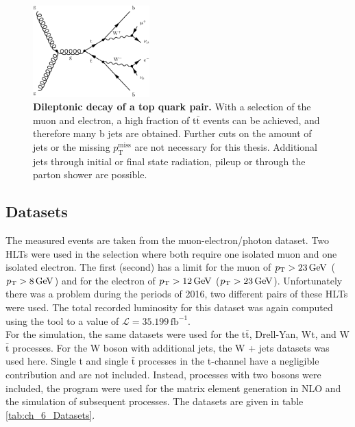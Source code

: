 \begin{figure}
\centering
\includegraphics[width=0.4\textwidth]{chapter_6_selection/Feynman/dilep_emu_tt.pdf}
\caption[Dileptonic Decay of a Top Quark Pair]{\textbf{Dileptonic decay of a top quark pair.} With a selection of the muon and electron, a high fraction of t$\bar{\textrm{t}}$ events can be achieved, and therefore many b jets are obtained. Further cuts on the amount of jets or the missing $p_\textrm{T}^\textrm{miss}$ are not necessary for this thesis. Additional jets through initial or final state radiation, pileup or through the parton shower are possible.}
\label{fig:ch_6_semilep_dilep}
\end{figure}

\subsection{Datasets}
The measured events are taken from the muon-electron/photon dataset. Two HLTs were used in the selection where both require one isolated muon and one isolated electron. The first (second) has a limit for the muon of $p_\mathrm{T} > 23\,\mathrm{GeV}$ ($p_\mathrm{T} > 8\,\mathrm{GeV}$) and for the electron of $p_\mathrm{T} > 12\,\mathrm{GeV}$ ($p_\mathrm{T} > 23\,\mathrm{GeV}$). Unfortunately there was a problem during the periods of 2016, two different pairs of these HLTs were used. The total recorded luminosity for this dataset was again computed using the \brilcalc tool to a value of $\mathcal{L} = 35.199\,\textrm{fb}^{-1}$.\\

For the simulation, the same datasets were used for the t$\bar{\textrm{t}}$, Drell-Yan, Wt, and W$\bar{\textrm{t}}$ processes. For the W boson with additional jets, the W + jets datasets was used here. Single t and single $\bar{\textrm{t}}$ processes in the t-channel have a negligible contribution and are not included. Instead, processes with two bosons were included, the  program were used for the matrix element generation in NLO and the simulation of subsequent processes. The datasets are given in table \ref{tab:ch_6_Datasets}. 

